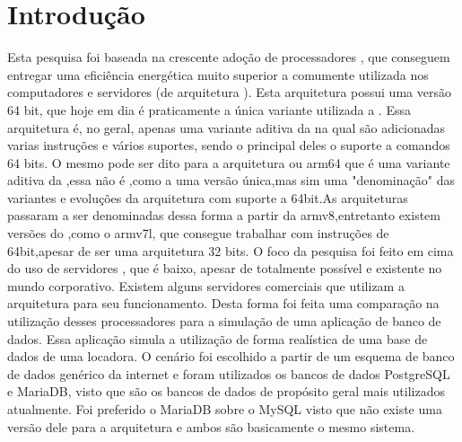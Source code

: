 \documentclass[
	12pt,				%
	openright,			%
	oneside,			%
	a4paper,			%
	english,			%
	french,				%
	spanish,			%
	brazil,				%
	]{abntex2}
\begin{document}
\tableofcontents*

\textual
\setcounter{page}{1}
\chapter*{Introdução}
\label{ch:introducao}
Esta pesquisa foi baseada na crescente adoção de processadores , que conseguem entregar uma eficiência energética muito superior a comumente utilizada nos computadores e servidores (de arquitetura ). Esta arquitetura possui uma versão 64 bit, que hoje em dia é praticamente a única variante utilizada a . Essa arquitetura é, no geral, apenas uma variante aditiva da  na qual são adicionadas varias instruções e vários suportes, sendo o principal deles o suporte a comandos 64 bits. O mesmo pode ser dito para a arquitetura  ou arm64 que é uma variante aditiva da ,essa não é ,como a  uma versão única,mas sim uma "denominação" das variantes e evoluções da arquitetura  com suporte a 64bit.As arquiteturas passaram a ser denominadas dessa forma a partir da armv8,entretanto existem versões do ,como o armv7l, que consegue trabalhar com instruções de 64bit,apesar de ser uma arquitetura 32 bits.\newline
O foco da pesquisa foi feito em cima do uso de servidores , que é baixo, apesar de totalmente possível e existente no mundo corporativo. Existem alguns servidores comerciais que utilizam a arquitetura  para seu funcionamento. Desta forma foi feita uma comparação na utilização desses processadores para a simulação de uma aplicação de banco de dados. Essa aplicação simula a utilização de forma realística de uma base de dados de uma locadora. \newline
O cenário foi escolhido a partir de um esquema de banco de dados genérico da internet e foram utilizados os bancos de dados PostgreSQL e MariaDB, visto que são os bancos de dados de propósito geral mais utilizados atualmente. Foi preferido o MariaDB sobre o MySQL visto que não existe uma versão dele para a arquitetura  e ambos são basicamente o mesmo sistema.\newline
\end{document}
